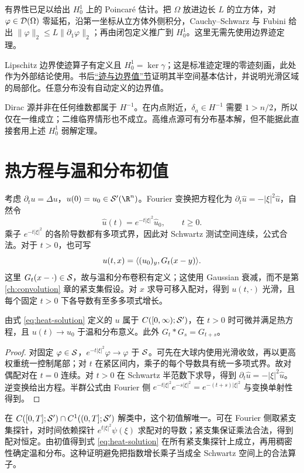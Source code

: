 \begin{methodnote}[能量估计中的两个前提]
有界性已足以给出 $H_0^1$ 上的 Poincaré 估计。把 $\Omega$ 放进边长 $L$ 的立方体，对 $\varphi\in\mathcal{D}(\Omega)$ 零延拓，沿第一坐标从立方体外侧积分，Cauchy--Schwarz 与 Fubini 给出 $\|\varphi\|_2\le L\|\partial_1\varphi\|_2$；再由闭包定义推广到 $H_0^1$。这里无需先使用边界迹定理。

Lipschitz 边界使迹算子有定义且 $H_0^1=\ker\gamma$；这是标准迹定理的零迹刻画，此处作为外部结论使用。书后\hyperref[sec:supp-trace]{“迹与边界值”节}证明其半空间基本估计，并说明光滑区域的局部化。任意分布没有自动定义的边界值。
\end{methodnote}

\begin{pitfall}[分布解与能量解的条件差别]
Dirac 源并非在任何维数都属于 $H^{-1}$。在内点附近，$\delta_a\in H^{-1}$ 需要 $1>n/2$，所以仅在一维成立；二维临界情形也不成立。高维点源可有分布基本解，但不能据此直接套用上述 $H_0^1$ 弱解定理。
\end{pitfall}

\section{热方程与温和分布初值}
考虑 $\partial_tu=\Delta u$，$u(0)=u_0\in\Temp(\R^n)$。Fourier 变换把方程化为 $\partial_t\widehat u=-|\xi|^2\widehat u$，自然令
\begin{equation}\label{eq:heat-solution}
 \widehat u(t)=e^{-t|\xi|^2}\widehat u_0,\qquad t\ge0.
\end{equation}
乘子 $e^{-t|\xi|^2}$ 的各阶导数都有多项式界，因此对 Schwartz 测试空间连续，公式合法。对于 $t>0$，也可写
\[
 u(t,x)=\langle (u_0)_y,G_t(x-y)\rangle.
\]
这里 $G_t(x-\cdot)\in\mathcal{S}$，故与温和分布卷积有定义；这使用 Gaussian 衰减，而不是第 \ref{ch:convolution} 章的紧支集假设。对 $x$ 求导可移入配对，得到 $u(t,\cdot)$ 光滑，且每个固定 $t>0$ 下各导数有至多多项式增长。

\begin{theorem}[热半群的基本性质]
由式 \eqref{eq:heat-solution} 定义的 $u$ 属于 $C([0,\infty);\mathcal{S}')$，在 $t>0$ 时可微并满足热方程，且 $u(t)\to u_0$ 于温和分布意义。此外 $G_t*G_s=G_{t+s}$。
\end{theorem}
\begin{proof}
对固定 $\varphi\in\mathcal{S}$，$e^{-t|\xi|^2}\varphi\to\varphi$ 于 $\mathcal{S}$。可先在大球内使用光滑收敛，再以更高权重统一控制尾部；对 $t$ 在紧区间内，乘子的每个导数具有统一多项式界。故对偶配对在 $t=0$ 连续。对 $t>0$ 在 Schwartz 半范数下求导，得到 $\partial_t\widehat u=-|\xi|^2\widehat u$。逆变换给出方程。半群公式由 Fourier 侧 $e^{-t|\xi|^2}e^{-s|\xi|^2}=e^{-(t+s)|\xi|^2}$ 与变换单射性得到。
\end{proof}
在 $C([0,T];\mathcal{S}')\cap C^1((0,T];\mathcal{S}')$ 解类中，这个初值解唯一。可在 Fourier 侧取紧支集探针，对时间依赖探针 $e^{t|\xi|^2}\psi(\xi)$ 求配对的导数；紧支集保证乘法合法，得到配对恒定。由初值得到式 \eqref{eq:heat-solution} 在所有紧支集探针上成立，再用稠密性确定温和分布。这种证明避免把指数增长乘子当成全 Schwartz 空间上的合法算子。

